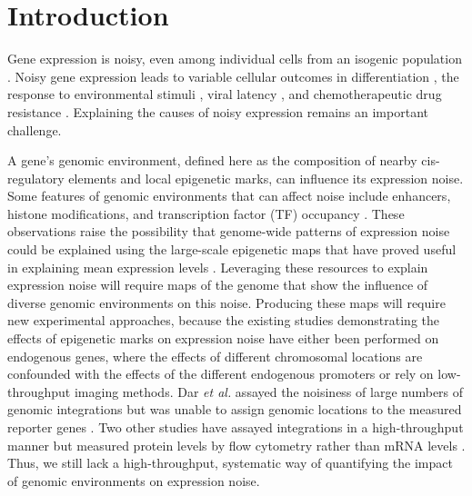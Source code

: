 \section{Introduction}

Gene expression is noisy, even among individual cells from an isogenic population \cite{raja_vanoudenaardena:NatureNurture2008}. Noisy gene expression leads to variable cellular outcomes in differentiation \cite{changhh_huangs:TranscriptomewideNoise2008,kalmart_ariasam:RegulatedFluctuations2009,abranchese_henriqued:StochasticNANOG2014,desairv_weinbergerls:DNARepair2021}, the response to environmental stimuli \cite{spencersl_sorgerpk:NongeneticOrigins2009, topolewskip_komorowskim:PhenotypicVariability2022}, viral latency \cite{weinbergerls_schafferdv:StochasticGene2005}, and chemotherapeutic drug resistance \cite{shaffersm_raja:RareCell2017, emertbl_raja:VariabilityRare2021, yangc_spencersl:MelanomaSubpopulations2021}. Explaining the causes of noisy expression remains an important challenge. 

A gene’s genomic environment, defined here as the composition of nearby cis-regulatory elements and local epigenetic marks, can influence its expression noise. Some features of genomic environments that can affect noise include enhancers, histone modifications, and transcription factor (TF) occupancy \cite{wus_qianw:IndependentRegulation2017, darrd_weinbergerls:TranscriptionalBurst2012, larsondr_singerrh:DirectObservation2013, senecala_darzacqx:TranscriptionFactors2014, waltersmc_martindi:EnhancersIncrease1995, weinbergerl_barkain:ExpressionNoise2012,faureaj_lehnerb:SystematicAnalysis2017}. These observations raise the possibility that genome-wide patterns of expression noise could be explained using the large-scale epigenetic maps that have proved useful in explaining mean expression levels \cite{akhtarw_vansteenselb:ChromatinPosition2013,kundajea_kellism:IntegrativeAnalysis2015,karlicr_vingronm:HistoneModification2010}. Leveraging these resources to explain expression noise will require maps of the genome that show the influence of diverse genomic environments on this noise. Producing these maps will require new experimental approaches, because the existing studies demonstrating the effects of epigenetic marks on expression noise have either been performed on endogenous genes, where the effects of different chromosomal locations are confounded with the effects of the different endogenous promoters or rely on low-throughput imaging methods. Dar \textit{et al.} assayed the noisiness of large numbers of genomic integrations but was unable to assign genomic locations to the measured reporter genes \cite{darrd_weinbergerls:TranscriptionalBurst2012}. Two other studies have assayed integrations in a high-throughput manner but measured protein levels by flow cytometry rather than mRNA levels \cite{deyss_arkinap:OrthogonalControl2015,zhangt_wollmanr:IdentifyingChromatin2020}. Thus, we still lack a high-throughput, systematic way of quantifying the impact of genomic environments on expression noise.

